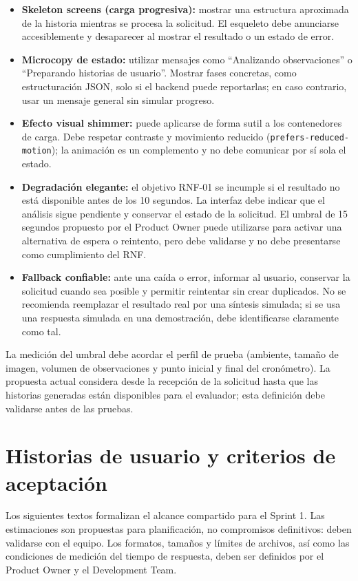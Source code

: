 \documentclass[12pt,a4paper]{article}
\begin{document}
\begin{itemize}
    \item \textbf{Skeleton screens (carga progresiva):} mostrar una estructura aproximada de la historia mientras se procesa la solicitud. El esqueleto debe anunciarse accesiblemente y desaparecer al mostrar el resultado o un estado de error.
    \item \textbf{Microcopy de estado:} utilizar mensajes como ``Analizando observaciones'' o ``Preparando historias de usuario''. Mostrar fases concretas, como estructuración JSON, solo si el backend puede reportarlas; en caso contrario, usar un mensaje general sin simular progreso.
    \item \textbf{Efecto visual shimmer:} puede aplicarse de forma sutil a los contenedores de carga. Debe respetar contraste y movimiento reducido (\texttt{prefers-reduced-motion}); la animación es un complemento y no debe comunicar por sí sola el estado.
    \item \textbf{Degradación elegante:} el objetivo RNF-01 se incumple si el resultado no está disponible antes de los 10 segundos. La interfaz debe indicar que el análisis sigue pendiente y conservar el estado de la solicitud. El umbral de 15 segundos propuesto por el Product Owner puede utilizarse para activar una alternativa de espera o reintento, pero debe validarse y no debe presentarse como cumplimiento del RNF.
    \item \textbf{Fallback confiable:} ante una caída o error, informar al usuario, conservar la solicitud cuando sea posible y permitir reintentar sin crear duplicados. No se recomienda reemplazar el resultado real por una síntesis simulada; si se usa una respuesta simulada en una demostración, debe identificarse claramente como tal.
\end{itemize}

La medición del umbral debe acordar el perfil de prueba (ambiente, tamaño de imagen,
volumen de observaciones y punto inicial y final del cronómetro). La propuesta actual
considera desde la recepción de la solicitud hasta que las historias generadas están
disponibles para el evaluador; esta definición debe validarse antes de las pruebas.

\section{Historias de usuario y criterios de aceptación}

Los siguientes textos formalizan el alcance compartido para el Sprint 1. Las
estimaciones son propuestas para planificación, no compromisos definitivos: deben
validarse con el equipo. Los formatos, tamaños y límites de archivos, así como las
condiciones de medición del tiempo de respuesta, deben ser definidos por el Product
Owner y el Development Team.
\end{document}
